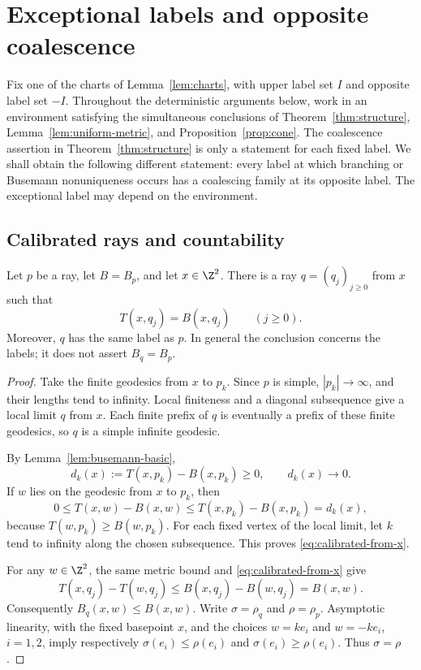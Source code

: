\section{Exceptional labels and opposite coalescence}
\label{sec:exceptional}

Fix one of the charts of Lemma~\ref{lem:charts}, with upper label
set $I$ and opposite label set $-I$.  Throughout the deterministic
arguments below, work in an environment satisfying the simultaneous
conclusions of Theorem~\ref{thm:structure}, Lemma~\ref{lem:uniform-metric},
and Proposition~\ref{prop:cone}.  The coalescence assertion in
Theorem~\ref{thm:structure} is only a statement for each fixed label.
We shall obtain the following different statement: every label at which
branching or Busemann nonuniqueness occurs has a coalescing family at its
opposite label.  The exceptional label may depend on the environment.

\subsection{Calibrated rays and countability}

\begin{lemma}
\label{lem:calibrated-rays}
Let $p$ be a ray, let $B=B_p$, and let $x\in\Z^2$.  There is a ray
$q=(q_j)_{j\ge0}$ from $x$ such that
\begin{equation}
  T(x,q_j)=B(x,q_j)\qquad(j\ge0).
  \label{eq:calibrated-from-x}
\end{equation}
Moreover, $q$ has the same label as $p$.  In general the conclusion
concerns the labels; it does not assert $B_q=B_p$.
\end{lemma}

\begin{proof}
Take the finite geodesics from $x$ to $p_k$.  Since $p$ is simple,
$|p_k|\to\infty$, and their lengths tend to infinity.  Local finiteness
and a diagonal subsequence give a local limit $q$ from $x$.  Each finite
prefix of $q$ is eventually a prefix of these finite geodesics, so $q$
is a simple infinite geodesic.

By Lemma~\ref{lem:busemann-basic},
\begin{equation}
 d_k(x):=T(x,p_k)-B(x,p_k)\ge0,
 \qquad d_k(x)\longrightarrow0.
 \label{eq:calibrated-limit-defect}
\end{equation}
If $w$ lies on the geodesic from $x$ to $p_k$, then
\[
 0\le T(x,w)-B(x,w)
 \le T(x,p_k)-B(x,p_k)=d_k(x),
\]
because $T(w,p_k)\ge B(w,p_k)$.  For each fixed vertex of the local
limit, let $k$ tend to infinity along the chosen subsequence.  This
proves \eqref{eq:calibrated-from-x}.

For any $w\in\Z^2$, the same metric bound and
\eqref{eq:calibrated-from-x} give
\[
 T(x,q_j)-T(w,q_j)
 \le B(x,q_j)-B(w,q_j)=B(x,w).
\]
Consequently $B_q(x,w)\le B(x,w)$.  Write $\sigma=\rho_q$ and
$\rho=\rho_p$.  Asymptotic linearity, with the fixed basepoint $x$,
and the choices $w=ke_i$ and $w=-ke_i$, $i=1,2$, imply respectively
$\sigma(e_i)\le\rho(e_i)$ and $\sigma(e_i)\ge\rho(e_i)$.
Thus $\sigma=\rho$.
\end{proof}

